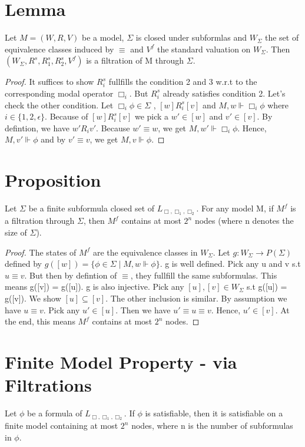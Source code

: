 \documentclass[12pt, a4paper]{scrreprt}
\begin{document}
\section{Lemma}
Let $M = (W,R,V)$ be a model, $\Sigma$ is closed under subformlas and $W_\Sigma$ the set of equivalence classes induced by $\equiv$ and $V^f$ the standard valuation on $W_\Sigma$. Then $(W_\Sigma, R^s,R^s_1,R^s_2,V^f)$ is 
a filtration of M through $\Sigma$.
\begin{proof}

It suffices to show $R^s_i$ fullfills the condition 2 and 3 w.r.t to the corresponding modal operator $\Box_i$. But $R^s_i$ already satisfies condition 2.
Let's check the other condition. Let $\Box_i \phi \in \Sigma$ , $[w]R^s_i[v]$ and $M,w \Vdash \Box_i \phi$ where $i \in \{1,2, \epsilon\}$. Because of $[w]R^s_i[v]$ we pick a $w' \in [w]$
and $v' \in [v]$. By defintion, we have $w'R_i v'$. Because $w' \equiv w$, we get $M,w' \Vdash \Box_i \phi$. Hence, $M,v' \Vdash \phi$ and by $v' \equiv v$, we get $M,v \Vdash \phi$.


\end{proof}

\section{Proposition}

Let $\Sigma$ be a finite subformula closed set of $L_{\Box,\Box_1,\Box_2}$. For any model M, if $M^f$ is a filtration through $\Sigma$, then $M^f$ contains at most $2^n$ nodes (where n denotes the size of $\Sigma$).

\begin{proof}
The states of $M^f$ are the equivalence classes in $W_\Sigma$. Let $g : W_\Sigma \rightarrow P(\Sigma)$ defined by $g([w]) = \{ \phi \in \Sigma \mid M,w \Vdash \phi\}$.
g is well defined. Pick any u and v s.t $u\equiv v$. But then by defintion of $\equiv$, they fullfill the same subformulas. This means g([v]) = g([u]). \newline
g is also injective. Pick any $[u],[v] \in W_\Sigma$ s.t g([u]) = g([v]). We show $[u]\subseteq[v]$. The other inclusion is similar.
By assumption we have $u \equiv v$. Pick any $u' \in [u]$. Then we have $u' \equiv u \equiv v$. Hence, $u' \in [v]$. At the end, this means $M^f$ contains at most $2^n$ nodes.
\end{proof} 

\section{Finite Model Property - via Filtrations}
Let $\phi$ be a formula of $L_{\Box,\Box_1,\Box_2}$. If $\phi$ is satisfiable, then it is satisfiable on a finite model containing at most $2^n$ nodes, where n is the number of subformulas in $\phi$.
\end{document}
